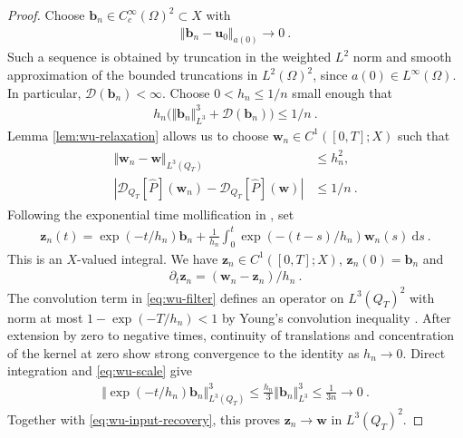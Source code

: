 \documentclass{article}
\theoremstyle{definition}
\newcommand{\bfu}{\boldsymbol{u}}
\newcommand{\bfw}{\boldsymbol{w}}
\newcommand{\D}{\mathcal{D}}
\newcommand{\dd}{\:\mathrm{d}}
\newcommand{\bfz}{\boldsymbol{z}}
\begin{document}
\begin{proof}
Choose $\boldsymbol{b}_n\in C_c^\infty(\Omega)^2\subset X$ with
\begin{align*}
 \Vert\boldsymbol{b}_n-\bfu_0\Vert_{a(0)}\rightarrow0 \ .
\end{align*}
Such a sequence is obtained by truncation in the weighted $L^2$ norm and
smooth approximation of the bounded truncations in $L^2(\Omega)^2$, since
$a(0)\in L^\infty(\Omega)$.
In particular, $\D(\boldsymbol{b}_n)<\infty$.
Choose $0<h_n\leq 1/n$ small enough that
\begin{align}\label{eq:wu-scale}
 h_n\bigl(\Vert\boldsymbol{b}_n\Vert_{L^3}^3+\D(\boldsymbol{b}_n)\bigr)\leq1/n \ .
\end{align}
Lemma \ref{lem:wu-relaxation} allows
us to choose $\bfw_n\in C^1([0,T];X)$ such that
\begin{align}\label{eq:wu-input-recovery}
    \begin{split}
    \Vert\bfw_n-\bfw\Vert_{L^3(Q_T)}&\leq h_n^2,\\
    |\D_{Q_T}[\hat P](\bfw_n)-\D_{Q_T}[\hat P](\bfw)|&\leq1/n\ .
    \end{split}
\end{align}
Following the exponential time mollification in \cite[Section 3.2]{E25}, set
\begin{align}\label{eq:wu-filter}
 \bfz_n(t)=\exp(-t/h_n)\boldsymbol{b}_n
       +\frac{1}{h_n}\int_0^t \exp(-(t-s)/h_n)\bfw_n(s)\dd s \ .
\end{align}
This is an $X$-valued integral. We have $\bfz_n\in C^1([0,T];X)$, $\bfz_n(0)=\boldsymbol{b}_n$ and
\begin{align}\label{eq:wu-filter-derivative}
 \partial_t \bfz_n=(\bfw_n-\bfz_n)/h_n \ .
\end{align}
The convolution term in \eqref{eq:wu-filter} defines an operator on
$L^3(Q_T)^2$ with norm at most $1-\exp(-T/h_n)<1$ by Young's convolution
inequality \cite[Chapter 4]{Br11}.
After extension by zero to negative times, continuity of translations and
concentration of the kernel at zero show strong convergence to the identity
as $h_n\rightarrow0$. Direct integration and \eqref{eq:wu-scale} give
\begin{align*}
 \Vert \exp(-t/h_n)\boldsymbol{b}_n\Vert_{L^3(Q_T)}^3\leq\frac{h_n}{3}\Vert\boldsymbol{b}_n\Vert_{L^3}^3\leq\frac{1}{3n}\rightarrow0 \ .
\end{align*}
Together with \eqref{eq:wu-input-recovery}, this proves $\bfz_n\rightarrow \bfw$ in $L^3(Q_T)^2$.


\end{proof}
\end{document}
